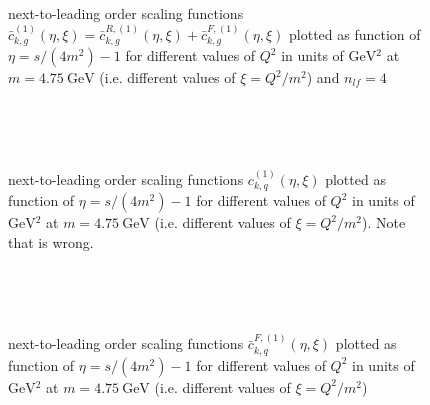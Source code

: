 \pagebreak
\begin{figure}[ht!]
\centering
\begin{subfigure}[t]{\textwidth}
	
\end{subfigure}\\%
\begin{subfigure}[t]{\textwidth}
	
\end{subfigure}\\%
\begin{subfigure}[t]{\textwidth}
	
\end{subfigure}
\caption{next-to-leading order scaling functions $\bar c_{k,g}^{(1)}(\eta,\xi) = \bar c_{k,g}^{R,(1)}(\eta,\xi)+\bar c_{k,g}^{F,(1)}(\eta,\xi)$ plotted as function of $\eta=s/(4m^2)-1$ for different values of $Q^2$ in units of $\si{\GeV^2}$ at $m=\SI{4.75}{\GeV}$ (i.e. different values of $\xi=Q^2/m^2$) and $n_{lf}=4$ }\label{fig:cgBar1}
\end{figure}

\pagebreak
\begin{figure}[ht!]
\centering
\begin{subfigure}[t]{\textwidth}
	
\end{subfigure}\\%
\begin{subfigure}[t]{\textwidth}
	
\end{subfigure}\\%
\begin{subfigure}[t]{\textwidth}
	
\end{subfigure}
\caption{next-to-leading order scaling functions $c_{k,q}^{(1)}(\eta,\xi)$ plotted as function of $\eta=s/(4m^2)-1$ for different values of $Q^2$ in units of $\si{\GeV^2}$ at $m=\SI{4.75}{\GeV}$ (i.e. different values of $\xi=Q^2/m^2$). Note that \cite[Fig. 9 (b)]{Laenen1993162} is wrong. }\label{fig:cq1}
\end{figure}

\pagebreak
\begin{figure}[ht!]
\centering
\begin{subfigure}[t]{\textwidth}
	
\end{subfigure}\\%
\begin{subfigure}[t]{\textwidth}
	
\end{subfigure}\\%
\begin{subfigure}[t]{\textwidth}
	
\end{subfigure}
\caption{next-to-leading order scaling functions $\bar c_{k,q}^{F,(1)}(\eta,\xi)$ plotted as function of $\eta=s/(4m^2)-1$ for different values of $Q^2$ in units of $\si{\GeV^2}$ at $m=\SI{4.75}{\GeV}$ (i.e. different values of $\xi=Q^2/m^2$)}\label{fig:cqBarF1}
\end{figure}


